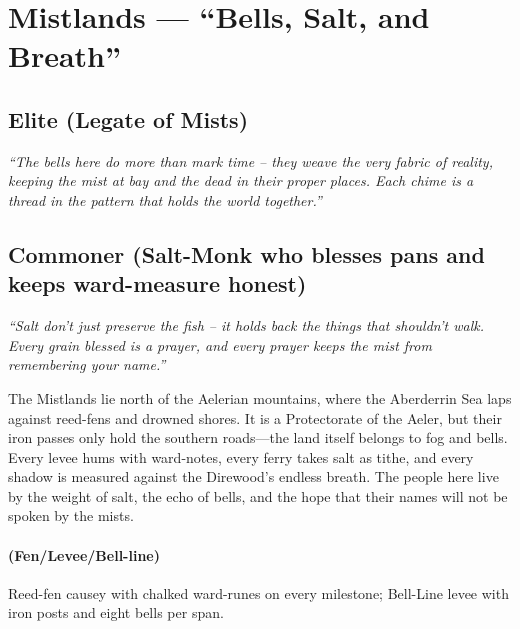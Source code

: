 \section{Mistlands --- ``Bells, Salt, and Breath''}
\label{chap:mistlands}

\subsection*{Elite (Legate of Mists)}
\textit{``The bells here do more than mark time – they weave the very fabric of reality, keeping the mist at bay and the dead in their proper places. Each chime is a thread in the pattern that holds the world together.''}

\subsection*{Commoner (Salt-Monk who blesses pans and keeps ward-measure honest)}
\textit{``Salt don't just preserve the fish – it holds back the things that shouldn't walk. Every grain blessed is a prayer, and every prayer keeps the mist from remembering your name.''}

\begin{tcolorbox}[colback=black!3,colframe=black!40!white,title={Theme \& Atmosphere}]
The Mistlands lie north of the Aelerian mountains, where the Aberderrin Sea laps against reed-fens and drowned shores. It is a Protectorate of the Aeler, but their iron passes only hold the southern roads---the land itself belongs to fog and bells. Every levee hums with ward-notes, every ferry takes salt as tithe, and every shadow is measured against the Direwood's endless breath. The people here live by the weight of salt, the echo of bells, and the hope that their names will not be spoken by the mists.
\end{tcolorbox}

\paragraph*{(Fen/Levee/Bell-line)} Reed-fen causey with chalked ward-runes on every milestone; Bell-Line levee with iron posts and eight bells per span.

